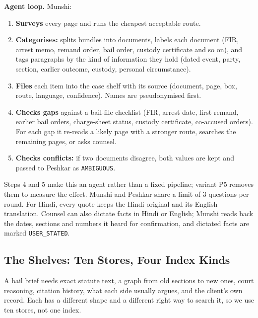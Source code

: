 \documentclass[10pt,a4paper]{article}
\newcommand{\st}[1]{\texttt{\small #1}}
\begin{document}
\textbf{Agent loop.} Munshi:

\begin{enumerate}
\item \textbf{Surveys} every page and runs the cheapest acceptable route.
\item \textbf{Categorises:} splits bundles into documents, labels each document (FIR, arrest memo, remand order, bail order, custody certificate and so on), and tags paragraphs by the kind of information they hold (dated event, party, section, earlier outcome, custody, personal circumstance).
\item \textbf{Files} each item into the case shelf with its source (document, page, box, route, language, confidence). Names are pseudonymised first.
\item \textbf{Checks gaps} against a bail-file checklist (FIR, arrest date, first remand, earlier bail orders, charge-sheet status, custody certificate, co-accused orders). For each gap it re-reads a likely page with a stronger route, searches the remaining pages, or asks counsel.
\item \textbf{Checks conflicts:} if two documents disagree, both values are kept and passed to Peshkar as \st{AMBIGUOUS}.
\end{enumerate}

Steps 4 and 5 make this an agent rather than a fixed pipeline; variant P5 removes them to measure the effect. Munshi and Peshkar share a limit of 3 questions per round. For Hindi, every quote keeps the Hindi original and its English translation. Counsel can also dictate facts in Hindi or English; Munshi reads back the dates, sections and numbers it heard for confirmation, and dictated facts are marked \st{USER\_\allowbreak{}STATED}.

\subsection{The Shelves: Ten Stores, Four Index Kinds}

A bail brief needs exact statute text, a graph from old sections to new ones, court reasoning, citation history, what each side usually argues, and the client's own record. Each has a different shape and a different right way to search it, so we use ten stores, not one index.
\end{document}
